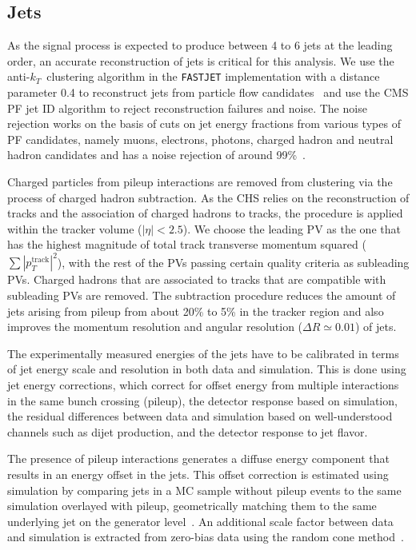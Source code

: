 \subsection{Jets}
\label{sec:object_id_jets}
As the signal process is expected to produce between 4 to 6 jets at the leading order, an accurate reconstruction of jets is critical for this analysis. We use the anti-$k_T$~clustering algorithm\cite{Cacciari:2008gp} in the \texttt{FASTJET} implementation\cite{Cacciari:2011ma} with a distance parameter 0.4 to reconstruct jets from particle flow candidates~\cite{CMS:2010xta,CMS:2009nxa,CMS:2010byl} and use the CMS PF jet ID algorithm to reject reconstruction failures and noise. The noise rejection works on the basis of cuts on jet energy fractions from various types of PF candidates, namely muons, electrons, photons, charged hadron and neutral hadron candidates and has a noise rejection of around 99\%~\cite{CMS:2017wyc}.

Charged particles from pileup interactions are removed from clustering via the process of charged hadron subtraction. As the CHS relies on the reconstruction of tracks and the association of charged hadrons to tracks, the procedure is applied within the tracker volume ($|\eta| < 2.5$). We choose the leading PV as the one that has the highest magnitude of total track transverse momentum squared ($\sum |p_T^{\mathrm{track}}|^2$), with the rest of the PVs passing certain quality criteria as subleading PVs. Charged hadrons that are associated to tracks that are compatible with subleading PVs are removed. The subtraction procedure reduces the amount of jets arising from pileup from about 20\% to 5\% in the tracker region and also improves the momentum resolution and angular resolution ($\Delta R \simeq 0.01$) of jets\cite{CMS:2014ata}.

The experimentally measured energies of the jets have to be calibrated in terms of jet energy scale and resolution in both data and simulation. This is done using jet energy corrections, which correct for offset energy from multiple interactions in the same bunch crossing (pileup), the detector response based on simulation, the residual differences between data and simulation based on well-understood channels such as dijet production, and the detector response to jet flavor. 

The presence of pileup interactions generates a diffuse energy component that results in an energy offset in the jets. This offset correction is estimated using simulation by comparing jets in a MC sample without pileup events to the same simulation overlayed with pileup, geometrically matching them to the same underlying jet on the generator level~\cite{cms_jec_2017}. An additional scale factor between data and simulation is extracted from zero-bias data using the random cone method~\cite{Chatrchyan:2011ds}.  


